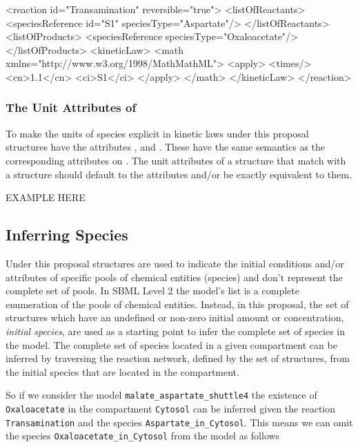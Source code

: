 \documentclass{cekarticle}
\begin{document}
\begin{example}
<reaction id="Transamination" reversible="true">
    <listOfReactants>
        <speciesReference id="S1" speciesType="Aspartate"/>
    </listOfReactants>
    <listOfProducts>
        <speciesReference speciesType="Oxaloacetate"/>
    </listOfProducts>
    <kineticLaw>
        <math xmlns="http://www.w3.org/1998/MathMathML">
            <apply>
                <times/>
                <cn>1.1</cn>
                <ci>S1</ci>
            </apply> 
        </math>
    </kineticLaw>
</reaction>
\end{example}

\subsubsection{The Unit Attributes of }

To make the units of species explicit in kinetic laws under this proposal 
 structures have the attributes ,
 and .  These have the same semantics as
the corresponding attributes on .  The unit attributes of a
 structure that match with a  structure should
default to the  attributes and/or be exactly equivalent to them.  

EXAMPLE HERE

\subsection{Inferring Species}

Under this proposal  structures are used to indicate the initial conditions
and/or attributes of specific pools of chemical entities (species) and don't represent the complete
set of pools.  In SBML Level 2 the model's  list is a complete enumeration of the
pools of chemical entities.  Instead, in this proposal, the set of  structures
which have an undefined or non-zero initial amount or concentration, \emph{initial species}, are used 
as a starting point to infer the complete set of species in the model.  The complete set of species
located in a given compartment can be inferred by traversing the reaction
network, defined by the set of  structures, from the initial species that are located
in the compartment.

So if we consider the model \texttt{malate\_aspartate\_shuttle4} the existence of
\texttt{Oxaloacetate} in the compartment \texttt{Cytosol} can be inferred given the reaction
\texttt{Transamination} and the species \texttt{Aspartate\_in\_Cytosol}.  This means we can omit
the species \texttt{Oxaloacetate\_in\_Cytosol} from the model as follows
\end{document}
